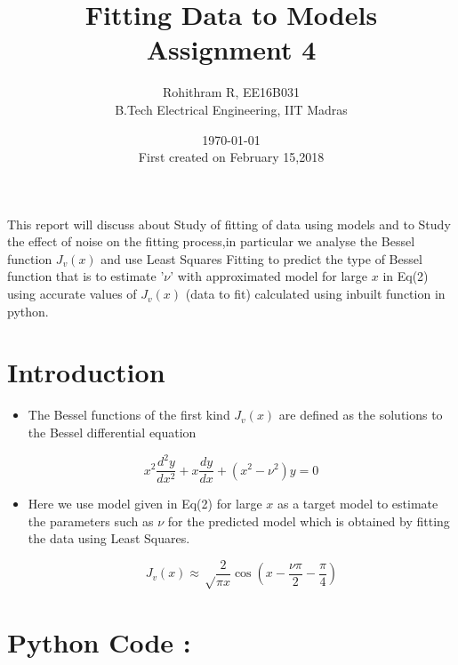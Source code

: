 \documentclass[a4paper,10pt]{article}
\title{Fitting Data to Models\\ Assignment 4}
\author{Rohithram R, EE16B031 \\ B.Tech Electrical Engineering, IIT Madras}
\date{\today \\ First created on February 15,2018}
\providecommand{\tightlist}{%
      \setlength{\itemsep}{0pt}\setlength{\parskip}{0pt}}
\begin{document}
    
    
    \maketitle
    
    

    
\begin{abstract}
\end{abstract}

 This report will discuss about Study of fitting of data using models
and to Study the effect of noise on the fitting process,in particular we
analyse the Bessel function \(J_{v}(x)\) and use Least Squares Fitting
to predict the type of Bessel function that is to estimate '\(\nu\)'
with approximated model for large \(x\) in Eq(2) using accurate values
of \(J_{v}(x)\) (data to fit) calculated using inbuilt function in
python.

    \section{Introduction}\label{introduction}

\begin{itemize}
\tightlist
\item
  The Bessel functions of the first kind \(J_{v}(x)\) are defined as the
  solutions to the Bessel differential equation
\end{itemize}

\begin{equation}
x^{2} \frac{d^2 y}{dx^2} + x\frac{dy}{dx}+(x^2-\nu^2)y = 0
   \end{equation}

\begin{itemize}
\tightlist
\item
  Here we use model given in Eq(2) for large \(x\) as a target model to
  estimate the parameters such as \(\nu\) for the predicted model which
  is obtained by fitting the data using Least Squares.

  \begin{equation}
  J_{v}(x) \approx \sqrt\frac{2}{\pi x}\cos(x-\frac{\nu\pi}{2}-\frac{\pi}{4})
  \end{equation}
\end{itemize}

    \section{Python Code :}\label{python-code}
\end{document}
